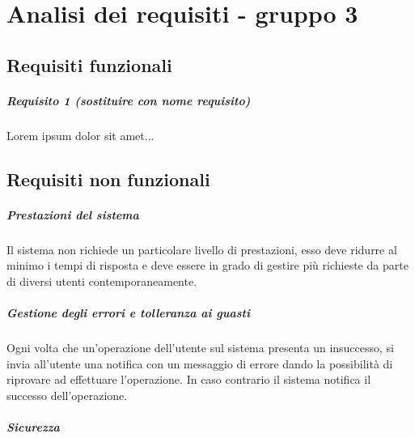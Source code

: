 
\chapter{Analisi dei requisiti - gruppo 3}
\label{ref:requisiti3}


\section{Requisiti funzionali}

\paragraph{Requisito 1 (sostituire con nome requisito) \\} 
Lorem ipsum dolor sit amet...

\section{Requisiti non funzionali}

\paragraph{Prestazioni del sistema\\} 

Il sistema non richiede un particolare livello di prestazioni, esso deve ridurre al minimo i tempi di risposta e deve essere in grado di gestire più richieste da parte di diversi utenti contemporaneamente.
\paragraph{Gestione degli errori e tolleranza ai guasti\\}

Ogni volta che un’operazione dell’utente sul sistema presenta un insuccesso, si invia all’utente una notifica con un messaggio di errore dando la possibilità di riprovare ad effettuare l’operazione. In caso contrario il sistema notifica il successo dell’operazione.

\paragraph{Sicurezza\\}

